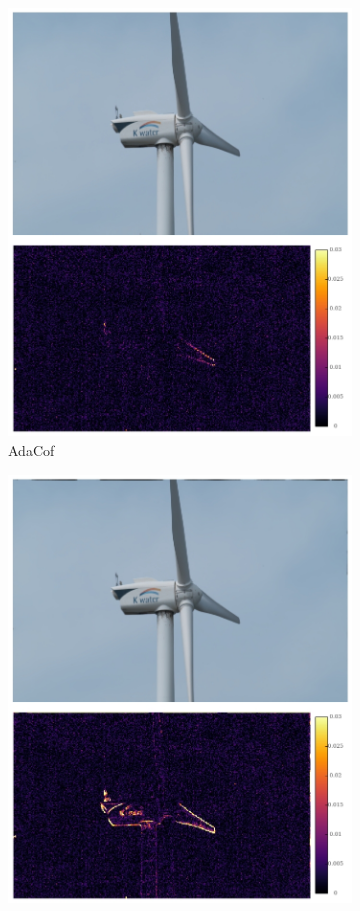\documentclass{article}
\begin{document}
\begin{figure}[h]
\begin{subfigure}{0.125\textwidth}
    \includegraphics[width=1\linewidth]{qua_imgs/TEST02_045_f0465_adacof.jpg}
    \caption{AdaCof}
\end{subfigure}%
\begin{subfigure}{0.125\textwidth}
	\centering
    \includegraphics[width=1\linewidth]{qua_imgs/TEST02_045_f0465_bmbc.jpg}

\end{subfigure}
\end{figure}
\end{document}
